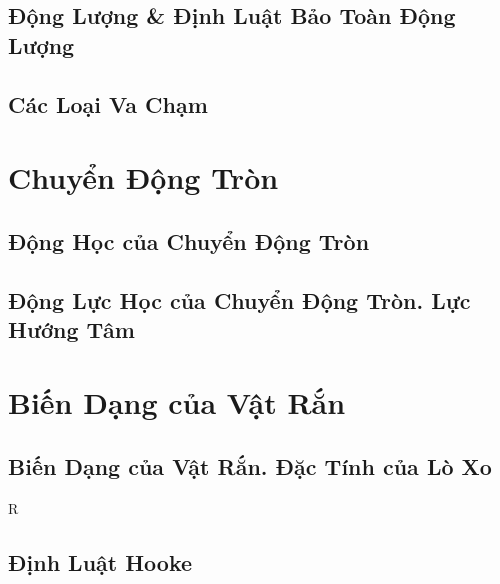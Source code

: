 \documentclass[oneside]{book}
\numberwithin{equation}{section}
\begin{document}
\section{Động Lượng \& Định Luật Bảo Toàn Động Lượng}


\section{Các Loại Va Chạm}


\chapter{Chuyển Động Tròn}

\section{Động Học của Chuyển Động Tròn}


\section{Động Lực Học của Chuyển Động Tròn. Lực Hướng Tâm}


\chapter{Biến Dạng của Vật Rắn}

\section{Biến Dạng của Vật Rắn. Đặc Tính của Lò Xo}

R
\section{Định Luật Hooke}


\printbibliography[heading=bibintoc]
	
\end{document}
